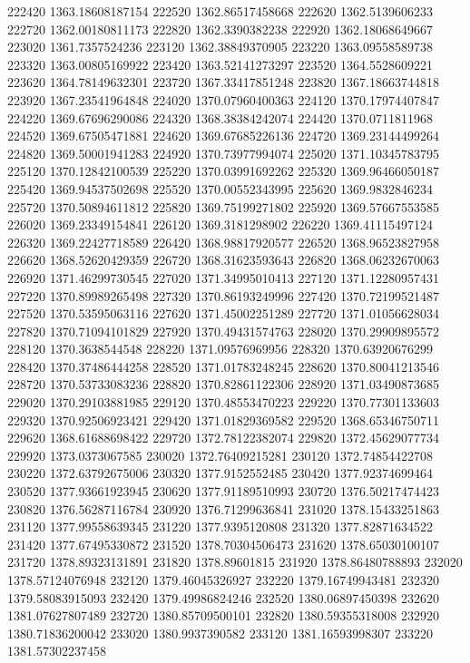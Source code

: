 {222420 1363.18608187154
222520 1362.86517458668
222620 1362.5139606233
222720 1362.00180811173
222820 1362.3390382238
222920 1362.18068649667
223020 1361.7357524236
223120 1362.38849370905
223220 1363.09558589738
223320 1363.00805169922
223420 1363.52141273297
223520 1364.5528609221
223620 1364.78149632301
223720 1367.33417851248
223820 1367.18663744818
223920 1367.23541964848
224020 1370.07960400363
224120 1370.17974407847
224220 1369.67696290086
224320 1368.38384242074
224420 1370.0711811968
224520 1369.67505471881
224620 1369.67685226136
224720 1369.23144499264
224820 1369.50001941283
224920 1370.73977994074
225020 1371.10345783795
225120 1370.12842100539
225220 1370.03991692262
225320 1369.96466050187
225420 1369.94537502698
225520 1370.00552343995
225620 1369.9832846234
225720 1370.50894611812
225820 1369.75199271802
225920 1369.57667553585
226020 1369.23349154841
226120 1369.3181298902
226220 1369.41115497124
226320 1369.22427718589
226420 1368.98817920577
226520 1368.96523827958
226620 1368.52620429359
226720 1368.31623593643
226820 1368.06232670063
226920 1371.46299730545
227020 1371.34995010413
227120 1371.12280957431
227220 1370.89989265498
227320 1370.86193249996
227420 1370.72199521487
227520 1370.53595063116
227620 1371.45002251289
227720 1371.01056628034
227820 1370.71094101829
227920 1370.49431574763
228020 1370.29909895572
228120 1370.3638544548
228220 1371.09576969956
228320 1370.63920676299
228420 1370.37486444258
228520 1371.01783248245
228620 1370.80041213546
228720 1370.53733083236
228820 1370.82861122306
228920 1371.03490873685
229020 1370.29103881985
229120 1370.48553470223
229220 1370.77301133603
229320 1370.92506923421
229420 1371.01829369582
229520 1368.65346750711
229620 1368.61688698422
229720 1372.78122382074
229820 1372.45629077734
229920 1373.0373067585
230020 1372.76409215281
230120 1372.74854422708
230220 1372.63792675006
230320 1377.9152552485
230420 1377.92374699464
230520 1377.93661923945
230620 1377.91189510993
230720 1376.50217474423
230820 1376.56287116784
230920 1376.71299636841
231020 1378.15433251863
231120 1377.99558639345
231220 1377.9395120808
231320 1377.82871634522
231420 1377.67495330872
231520 1378.70304506473
231620 1378.65030100107
231720 1378.89323131891
231820 1378.89601815
231920 1378.86480788893
232020 1378.57124076948
232120 1379.46045326927
232220 1379.16749943481
232320 1379.58083915093
232420 1379.49986824246
232520 1380.06897450398
232620 1381.07627807489
232720 1380.85709500101
232820 1380.59355318008
232920 1380.71836200042
233020 1380.9937390582
233120 1381.16593998307
233220 1381.57302237458
}
